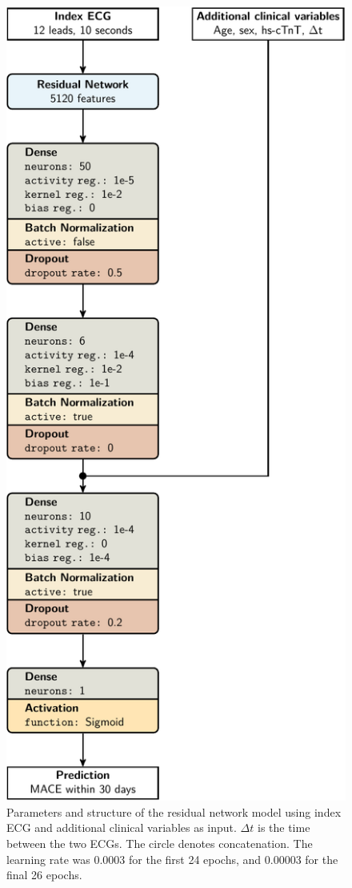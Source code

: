 \documentclass[preprint]{elsarticle}
\begin{document}
\begin{figure}[H]
\centering
\includegraphics[scale=\modelscale,keepaspectratio,trim=-16em 0 0 0]{figures/model-rn3.pdf}
\caption{Parameters and structure of the residual network model using index ECG and additional clinical variables as input. $\Delta t$ is the time between the two ECGs. The circle denotes concatenation. The learning rate was 0.0003 for the first 24 epochs, and 0.00003 for the final 26 epochs.}
\end{figure}
\end{document}
